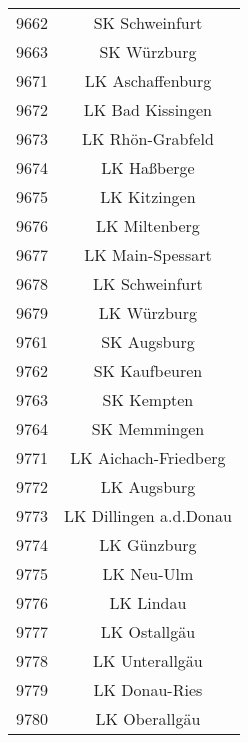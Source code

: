\begin{tabular}{c c}
    9662&SK Schweinfurt\\ 
    9663&SK Würzburg\\ 
    9671&LK Aschaffenburg\\ 
    9672&LK Bad Kissingen\\ 
    9673&LK Rhön-Grabfeld\\ 
    9674&LK Haßberge\\ 
    9675&LK Kitzingen\\ 
    9676&LK Miltenberg\\ 
    9677&LK Main-Spessart\\ 
    9678&LK Schweinfurt\\ 
    9679&LK Würzburg\\ 
    9761&SK Augsburg\\ 
    9762&SK Kaufbeuren\\ 
    9763&SK Kempten\\ 
    9764&SK Memmingen\\ 
    9771&LK Aichach-Friedberg\\ 
    9772&LK Augsburg\\ 
    9773&LK Dillingen a.d.Donau\\ 
    9774&LK Günzburg\\ 
    9775&LK Neu-Ulm\\ 
    9776&LK Lindau\\ 
    9777&LK Ostallgäu\\ 
    9778&LK Unterallgäu\\ 
    9779&LK Donau-Ries\\ 
    9780&LK Oberallgäu\\ 

\end{tabular}